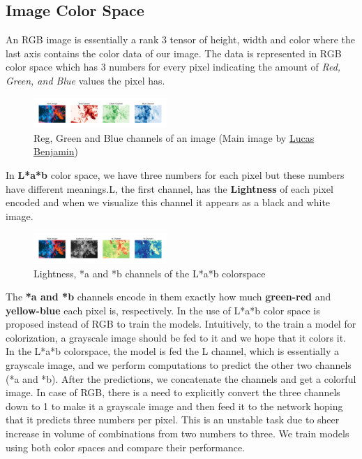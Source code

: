 \documentclass[10pt,twocolumn,letterpaper]{article}
\begin{document}
    \subsection{Image Color Space}
    \hspace*{0.167 in}An RGB image is essentially a rank 3 tensor of height, width and color where the last axis contains the color data of our image. The data is represented in RGB color space which has 3 numbers for every pixel indicating the amount of \textit{Red, Green, and Blue} values the pixel has.
    \begin{figure}[!htb]
    \begin{center}
    	\includegraphics[width=0.45\textwidth]{figures/rgb_colorspace}
    	\caption{Reg, Green and Blue channels of an image (Main image by \href{https://unsplash.com/@aznbokchoy}{Lucas Benjamin})}
    	\label{rgb_colorspace}
    \end{center}
    \end{figure}
    In \textbf{L*a*b} color space, we have three numbers for each pixel but these numbers have different meanings.L, the first channel, has the \textbf{Lightness} of each pixel encoded and when we visualize this channel it appears as a black and white image. 
    \begin{figure}[!htb]
    \begin{center}
    	\includegraphics[width=0.45\textwidth]{figures/Lab_colorspace}
    	\caption{Lightness, *a and *b channels of the L*a*b colorspace}
    	\label{lab_colorspace}
    \end{center}
    \end{figure}
    The \textbf{*a and *b} channels encode in them exactly how much \textbf{green-red} and \textbf{yellow-blue} each pixel is, respectively.
    In \cite{guadarrama2017pixcolor,isola2018imagetoimage} the use of L*a*b color space is proposed instead of RGB to train the models. Intuitively, to the train a model for colorization, a grayscale image should be fed to it and we hope that it colors it. In the L*a*b colorspace, the model is fed the L channel, which is essentially a grayscale image, and we perform computations to predict the other two channels (*a and *b). After the predictions, we concatenate the channels and get a colorful image. In case of RGB, there is a need to explicitly convert the three channels down to 1 to make it a grayscale image and then feed it to the network hoping that it predicts three numbers per pixel. This is an unstable task due to sheer increase in volume of combinations from two numbers to three. We train models using both color spaces and compare their performance.
\end{document}

